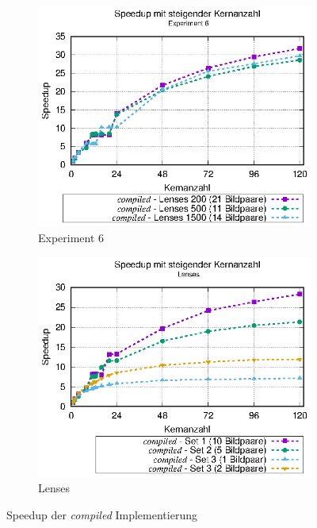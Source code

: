 \begin{center}
	\begin{figure}[htbp]
		\begin{subfigure}[b]{0.45\textwidth}
			\centering
			\includegraphics[width=\textwidth]{pdf/best_speedup_exp6_standalone}
			\caption{Experiment 6}
			\label{fig:best_speedup_exp6_standalone}
		\end{subfigure}
		\hfill
		\begin{subfigure}[b]{0.45\textwidth}
			\centering
			\includegraphics[width=\textwidth]{pdf/best_speedup_lenses_standalone}
			\caption{Lenses}
			\label{fig:best_speedup_lenses_standalone}
		\end{subfigure}
		\caption{Speedup der \textit{compiled} Implementierung}
		\label{fig:best_speedup_standalone}
	\end{figure}
\end{center}

